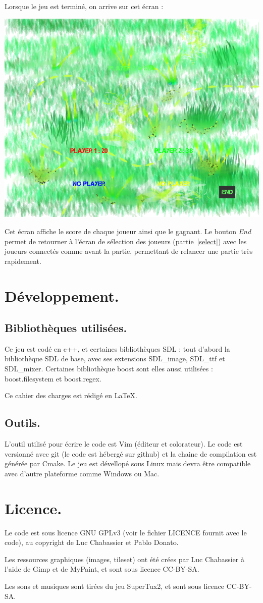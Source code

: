 \documentclass{article}
\begin{document}
Lorsque le jeu est terminé, on arrive sur cet écran :
\begin{center}
	\includegraphics[scale=0.4]{img/game_over.png}
\end{center}
Cet écran affiche le score de chaque joueur ainsi que le gagnant. Le bouton \emph{End} permet de retourner à l'écran de sélection des joueurs (partie~\ref{select}) avec les joueurs connectés comme avant la partie, permettant de relancer une partie très rapidement.

\section{Développement.}
\subsection{Bibliothèques utilisées.}
Ce jeu est codé en c++, et certaines bibliothèques SDL : tout d'abord la bibliothèque SDL de base, avec ses extensions SDL\_image, SDL\_ttf et SDL\_mixer. Certaines bibliothèque boost sont elles aussi utilisées : boost.filesystem et boost.regex.

Ce cahier des charges est rédigé en \LaTeX.

\subsection{Outils.}
L'outil utilisé pour écrire le code est Vim (éditeur et colorateur). Le code est versionné avec git (le code est hébergé sur github) et la chaine de compilation est générée par Cmake. Le jeu est dévellopé sous Linux mais devra être compatible avec d'autre plateforme comme Windows ou Mac.

\section{Licence.}
Le code est sous licence GNU GPLv3 (voir le fichier LICENCE fournit avec le code), au copyright de Luc Chabassier et Pablo Donato.

Les ressources graphiques (images, tileset) ont été crées par Luc Chabassier à l'aide de Gimp et de MyPaint, et sont sous licence CC-BY-SA.

Les sons et musiques sont tirées du jeu SuperTux2, et sont sous licence CC-BY-SA.
\end{document}
